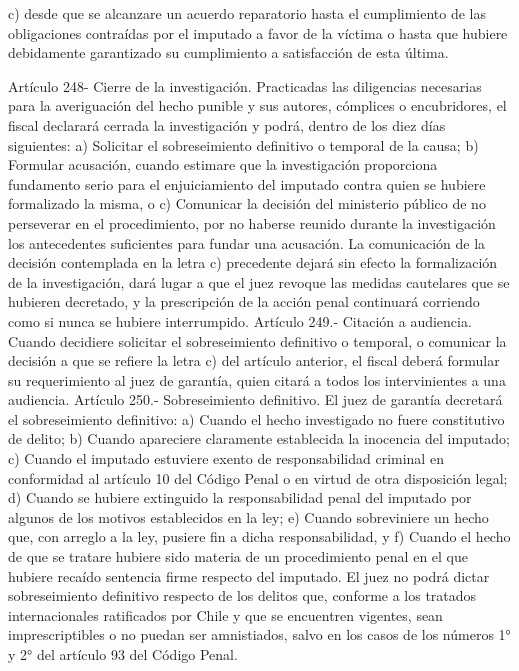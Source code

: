     c) desde que se alcanzare un acuerdo reparatorio
hasta el cumplimiento de las obligaciones contraídas por
el imputado a favor de la víctima o hasta que hubiere
debidamente garantizado su cumplimiento a satisfacción
de esta última.



    Artículo 248- Cierre de la investigación. Practicadas las diligencias necesarias para la averiguación del hecho punible y sus autores, cómplices o encubridores, el fiscal declarará cerrada la investigación y podrá, dentro de los diez días siguientes:
    a) Solicitar el sobreseimiento definitivo o temporal de la causa;
    b) Formular acusación, cuando estimare que la investigación proporciona fundamento serio para el enjuiciamiento del imputado contra quien se hubiere formalizado la misma, o
    c) Comunicar la decisión del ministerio público de no perseverar en el procedimiento, por no haberse reunido durante la investigación los antecedentes suficientes para fundar una acusación.
    La comunicación de la decisión contemplada en la letra c) precedente dejará sin efecto la formalización de la investigación, dará lugar a que el juez revoque las medidas cautelares que se hubieren decretado, y la prescripción de la acción penal continuará corriendo como si nunca se hubiere interrumpido.
    Artículo 249.- Citación a audiencia. Cuando decidiere solicitar el sobreseimiento definitivo o temporal, o comunicar la decisión a que se refiere la letra c) del artículo anterior, el fiscal deberá formular su requerimiento al juez de garantía, quien citará a todos los intervinientes a una audiencia.
    Artículo 250.- Sobreseimiento definitivo. El juez de garantía decretará el sobreseimiento definitivo:
    a) Cuando el hecho investigado no fuere constitutivo de delito;
    b) Cuando apareciere claramente establecida la inocencia del imputado;
    c) Cuando el imputado estuviere exento de responsabilidad criminal en conformidad al artículo 10 del Código Penal o en virtud de otra disposición legal;
    d) Cuando se hubiere extinguido la responsabilidad penal del imputado por algunos de los motivos establecidos en la ley;
    e) Cuando sobreviniere un hecho que, con arreglo a la ley, pusiere fin a dicha responsabilidad, y
    f) Cuando el hecho de que se tratare hubiere sido materia de un procedimiento penal en el que hubiere recaído sentencia firme respecto del imputado.
    El juez no podrá dictar sobreseimiento definitivo respecto de los delitos que, conforme a los tratados internacionales ratificados por Chile y que se encuentren vigentes, sean imprescriptibles o no puedan ser amnistiados, salvo en los casos de los números 1° y 2° del artículo 93 del Código Penal.

